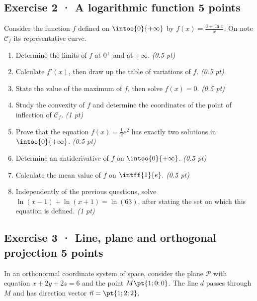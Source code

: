\subsection*{Exercise 2 · A logarithmic function \hfill 5 points}Consider the function $f$ defined on $\intoo{0}{+\infty}$ by $f(x)=\frac{3+\ln x}x$. On note $\mathcal C_f$ its representative curve.

\begin{enumerate}

\item Determine the limits of $f$ at $0^+$ and at $+\infty$. \hfill\textit{(0.5 pt)}

\item Calculate $f' (x)$, then draw up the table of variations of $f$. \hfill\textit{(0.5 pt)}

\item State the value of the maximum of $f$, then solve $f(x)=0$. \hfill\textit{(0.5 pt)}

\item Study the convexity of $f$ and determine the coordinates of the point of inflection of $\mathcal C_f$. \hfill\textit{(1 pt)}

\item Prove that the equation $f(x)=\frac12 e^{2}$ has exactly two solutions in $\intoo{0}{+\infty}$. \hfill\textit{(0.5 pt)}

\item Determine an antiderivative of $f$ on $\intoo{0}{+\infty}$. \hfill\textit{(0.5 pt)}

\item Calculate the mean value of $f$ on $\intff{1}{e}$. \hfill\textit{(0.5 pt)}

\item Independently of the previous questions, solve $\ln(x-1)+\ln(x+1)=\ln(63)$, after stating the set on which this equation is defined. \hfill\textit{(1 pt)}

\end{enumerate}

\mxnewpage{}

\subsection*{Exercise 3 · Line, plane and orthogonal projection \hfill 5 points}In an orthonormal coordinate system of space, consider the plane $\mathcal P$ with equation $x+2y+2z=6$ and the point $M\pt{1;0;0}$. The line $d$ passes through $M$ and has direction vector $\vec n=\pt{1;2;2}$.

